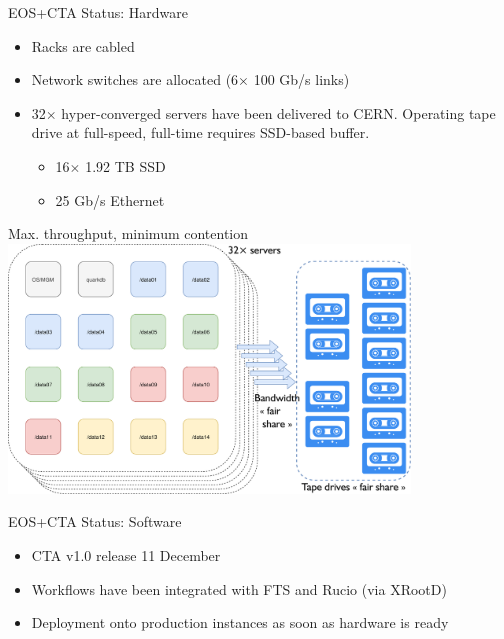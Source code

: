 \documentclass[aspectratio=1610]{beamer}
\begin{document}
\begin{frame}{EOS+CTA Status: Hardware}
   \begin{itemize}
      \item Racks are cabled
      \item Network switches are allocated (6$\times$ 100 Gb/s links)
      \item 32$\times$ hyper-converged servers have been delivered to CERN.
         Operating tape drive at full-speed, full-time requires SSD-based buffer.
      \begin{itemize}
         \item 16$\times$ 1.92 TB SSD
         \item 25 Gb/s Ethernet
      \end{itemize}
   \end{itemize}
\end{frame}

\begin{frame}{Max. throughput, minimum contention}
  \centering
  \vspace{1ex}
  \includegraphics[width=0.8\textwidth]{images/hw_setup.pdf}
\end{frame}

\begin{frame}{EOS+CTA Status: Software}
   \begin{itemize}
      \item CTA v1.0 release 11 December
      \item Workflows have been integrated with FTS and Rucio (via XRootD)
      \item Deployment onto production instances as soon as hardware is ready
   \end{itemize}
\end{frame}
\end{document}
